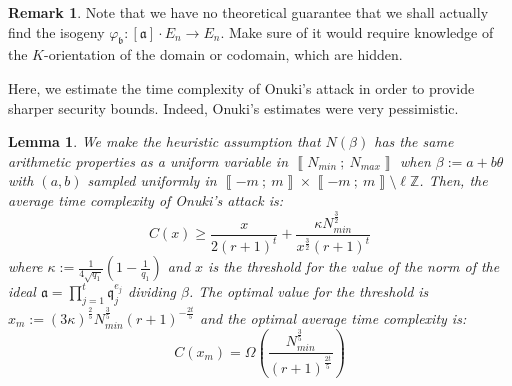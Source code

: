 \documentclass[a4paper,10pt]{report}
\theoremstyle{definition}
\theoremstyle{plain}
\newtheorem{lemma}[definition]{Lemma}
\theoremstyle{definition}
\newtheorem{remark}[definition]{Remark}
\newcommand{\Z}{\mathbb{Z}}
\renewcommand{\i}[2]{\left\llbracket #1~;~#2\right\rrbracket}
\renewcommand{\(}{\left(}
\renewcommand{\)}{\right)}
\newcommand{\mf}[1]{\mathfrak{#1}}
\begin{document}
\begin{remark}
Note that we have no theoretical guarantee that we shall actually find the isogeny $\varphi_{\mf{b}}:[\mf{a}]\cdot E_n\longrightarrow E_n$. Make sure of it would require knowledge of the $K$-orientation of the domain or codomain, which are hidden.
\end{remark} 

Here, we estimate the time complexity of Onuki's attack in order to provide sharper security bounds. Indeed, Onuki's estimates were very pessimistic.

\begin{lemma}
We make the heuristic assumption that $N(\beta)$ has the same arithmetic properties as a uniform variable in $\i{N_{min}}{N_{max}}$ when $\beta:=a+b\theta$ with $(a,b)$ sampled uniformly in $\i{-m}{m}\times\i{-m}{m}\setminus\ell\Z$. Then, the average time complexity of Onuki's attack \cite[§ 6.3]{Onuki} is:
\[C(x)\geq \frac{x}{2(r+1)^t}+\frac{\kappa N_{min}^{\frac{3}{2}}}{x^{\frac{3}{2}}(r+1)^t}\]
where $\kappa:=\frac{1}{4\sqrt{q_1}}\(1-\frac{1}{q_1}\)$ and $x$ is the threshold for the value of the norm of the ideal $\mf{a}=\prod_{j=1}^t\mf{q}_j^{e_j}$ dividing $\beta$. The optimal value for the threshold is $x_m:=(3\kappa)^{\frac{2}{5}}N_{min}^{\frac{3}{5}}(r+1)^{-\frac{2t}{5}}$ and the optimal average time complexity is: 
\[C(x_m)=\Omega\(\frac{N_{min}^{\frac{3}{5}}}{(r+1)^{\frac{2t}{5}}}\)\]
\end{lemma}
\end{document}

